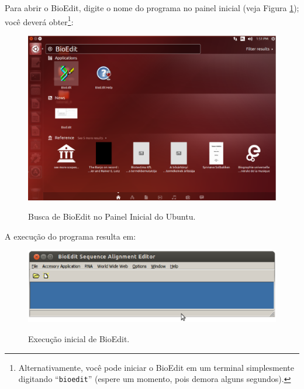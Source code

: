 \begin{refsection}
Para abrir o BioEdit, digite o nome do programa no painel inicial (veja Figura \ref{tut7:fig:bioedit}); você deverá obter\footnote{Alternativamente, você pode iniciar o BioEdit em um terminal simplesmente digitando ``\texttt{bioedit}'' (espere um momento, pois demora alguns segundos).}:\\

  \begin{figure}[H]
      {\includegraphics[scale=0.3]{figures/tut7/bioedit.eps}}
	{\caption[Bioedit: busca no Ubuntu]{Busca de BioEdit no Painel Inicial do Ubuntu.}\label{tut7:fig:bioedit}}
  \end{figure}


A execução do programa resulta em:

  \begin{figure}[H]
      {\includegraphics[scale=0.5]{figures/tut7/bioedit_2.eps}}
	{\caption[Bioedit]{Execução inicial de BioEdit.}\label{tut7:fig:bioedit_2}}
  \end{figure}


\end{refsection}
